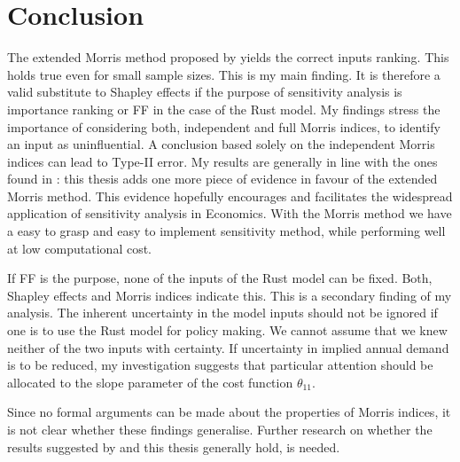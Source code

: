 \section{Conclusion} \label{conclusion}



The extended Morris method proposed by \citet{GM17} yields the correct inputs ranking. This holds true even for small sample sizes. This is my main finding. It is therefore a valid substitute to Shapley effects if the purpose of sensitivity analysis is importance ranking or FF in the case of the Rust model. My findings stress the importance of considering both, independent and full Morris indices, to identify an input as uninfluential. A conclusion based solely on the independent Morris indices can lead to Type-II error. My results are generally in line with the ones found in \citet{GM17}: this thesis adds one more piece of evidence in favour of the extended Morris method. This evidence hopefully encourages and facilitates the widespread application of sensitivity analysis in Economics. With the Morris method we have a easy to grasp and easy to implement sensitivity method, while performing well at low computational cost.

If FF is the purpose, none of the inputs of the Rust model can be fixed. Both, Shapley effects and Morris indices indicate this. This is a secondary finding of my analysis. The inherent uncertainty in the model inputs should not be ignored if one is to use the Rust model for policy making. We cannot assume that we knew neither of the two inputs with certainty. If uncertainty in implied annual demand is to be reduced, my investigation suggests that particular attention should be allocated to the slope parameter of the cost function $\theta_{11}$.


Since no formal arguments can be made about the properties of Morris indices, it is not clear whether these findings generalise. Further research on whether the results suggested by \citet{GM17} and this thesis generally hold, is needed.

